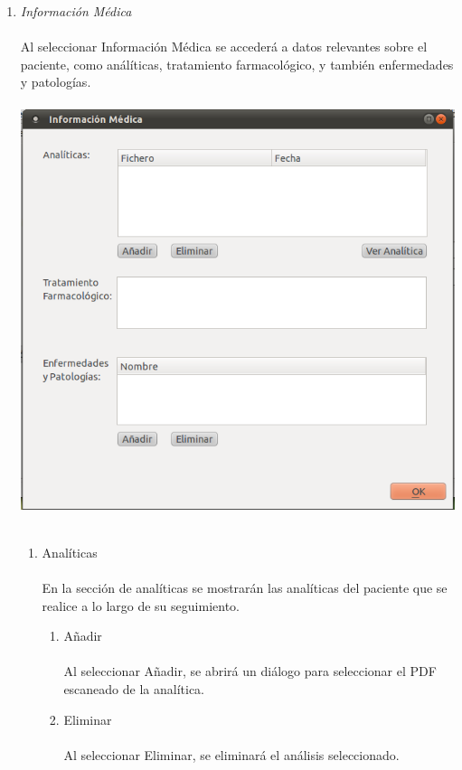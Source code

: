 \documentclass[12pt, spanish]{article}
\begin{document}
\begin{enumerate}
\item \textit{Información Médica}\\\\
Al seleccionar Información Médica se accederá a datos relevantes sobre el paciente, como análíticas, tratamiento farmacológico, y también enfermedades y patologías.\\\\
\includegraphics[scale=0.5]{Image/infomed.png}\\\\
\begin{enumerate}
\item Analíticas\\\\
En la sección de analíticas se mostrarán las analíticas del paciente que se realice a lo largo de su seguimiento.
\begin{enumerate}
\item Añadir\\\\
Al seleccionar Añadir, se abrirá un diálogo para seleccionar el PDF escaneado de la analítica.\\
\item Eliminar\\\\
Al seleccionar Eliminar, se eliminará el análisis seleccionado.\\

\end{enumerate}
\end{enumerate}
\end{enumerate}
\end{document}
